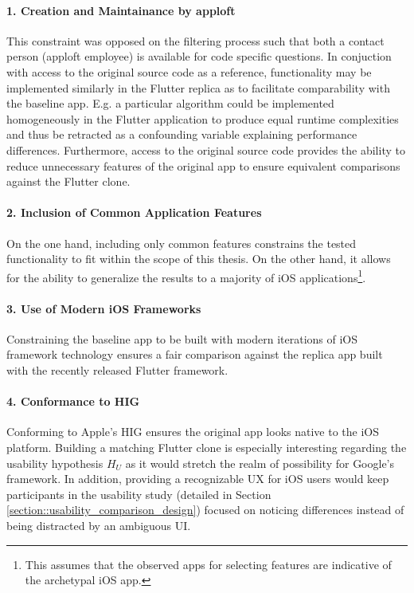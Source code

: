 \paragraph*{1. Creation and Maintainance by apploft}\hfill \break
This constraint was opposed on the filtering process such that both a contact person (apploft
employee) is available for code specific questions. In conjuction with access to the original
source code as a reference, functionality may be implemented similarly in the Flutter replica as to
facilitate comparability with the baseline app. E.g. a particular algorithm could be implemented
homogeneously in the Flutter application to produce equal runtime complexities and thus be
retracted as a confounding variable explaining performance differences. Furthermore, access to
the original source code provides the ability to reduce unnecessary features of the original app
to ensure equivalent comparisons against the Flutter clone.

\paragraph*{2. Inclusion of Common Application Features}\hfill \break
On the one hand, including only common features constrains the tested functionality to fit within the scope of this thesis. On the other hand, it allows for
the ability to generalize the results to a majority of iOS applications\footnote{This assumes that the observed apps for selecting features are indicative of the archetypal iOS app.}.


\paragraph*{3. Use of Modern iOS Frameworks}\hfill \break
Constraining the baseline app to be built with modern iterations of iOS framework technology ensures a fair comparison 
against the replica app built with the recently released Flutter framework.


\paragraph*{4. Conformance to HIG}\hfill \break
Conforming to Apple's HIG ensures the original app looks native to the iOS platform. Building a matching Flutter clone is especially 
interesting regarding the usability hypothesis $H_U$ as it would stretch the realm of possibility for Google's framework.
In addition, providing a recognizable UX for iOS users would keep participants in the usability study (detailed in Section \ref{section::usability_comparison_design}) focused on noticing differences instead of 
being distracted by an ambiguous UI.\\
\hfill \break
\hfill \break


